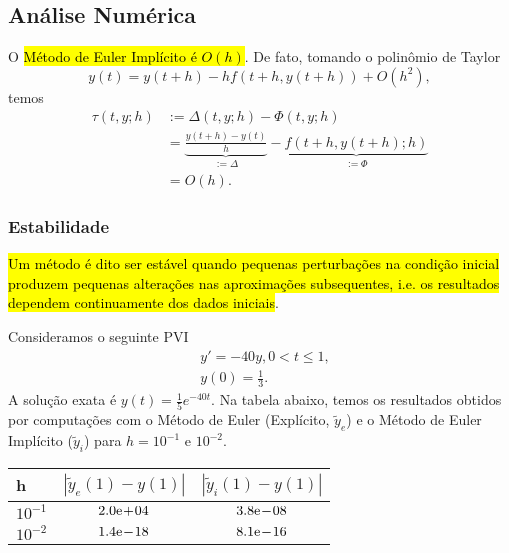 \subsection{Análise Numérica}

O \hl{Método de Euler Implícito é $O(h)$}. De fato, tomando o polinômio de Taylor
\begin{equation}
  y(t) = y(t+h) -hf\left(t+h, y(t+h)\right) + O(h^2),
\end{equation}
temos
\begin{align}
  \tau(t, y; h) &:= \Delta(t,y; h) - \Phi(t, y; h) \\
                &= \underbrace{\frac{y(t+h) - y(t)}{h}}_{:= \Delta} - \underbrace{f(t+h, y(t+h); h)}_{:= \Phi}\\
                &= O(h).
\end{align}

\subsubsection{Estabilidade}

\hl{Um método é dito ser estável quando pequenas perturbações na condição inicial produzem pequenas alterações nas aproximações subsequentes, i.e. os resultados dependem continuamente dos dados iniciais}.

\begin{ex}
  Consideramos o seguinte PVI
  \begin{subequations}
    \begin{align}
      &y' = -40y, 0 < t \leq 1,\\
      &y(0) = \frac{1}{3}.
    \end{align}
  \end{subequations}
  A solução exata é $y(t) = \frac{1}{5}e^{-40t}$. Na tabela abaixo, temos os resultados obtidos por computações com o Método de Euler (Explícito, $\tilde{y}_e$) e o Método de Euler Implícito ($\tilde{y}_i$) para $h = 10^{-1}$ e $10^{-2}$.

  \begin{center}
    \begin{tabular}{lcc}
      h & $\left|\tilde{y}_e(1) - y(1)\right|$ & $\left|\tilde{y}_i(1) - y(1)\right|$ \\\hline
      $10^{-1}$ & $2.0\mathrm{e}\!+\!04$ & $3.8\mathrm{e}\!-\!08$ \\
      $10^{-2}$ & $1.4\mathrm{e}\!-\!18$ & $8.1\mathrm{e}\!-\!16$ \\\hline
    \end{tabular}
  \end{center}
\end{ex}

